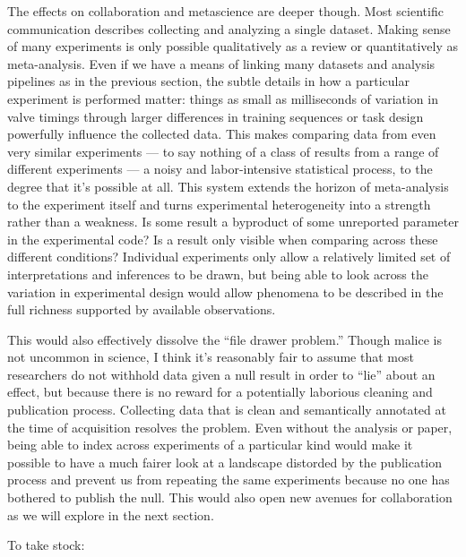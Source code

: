 The effects on collaboration and metascience are deeper though. Most
scientific communication describes collecting and analyzing a single
dataset. Making sense of many experiments is only possible qualitatively
as a review or quantitatively as meta-analysis. Even if we have a means
of linking many datasets and analysis pipelines as in the previous
section, the subtle details in how a particular experiment is performed
matter: things as small as milliseconds of variation in valve timings
through larger differences in training sequences or task design
powerfully influence the collected data. This makes comparing data from
even very similar experiments --- to say nothing of a class of results
from a range of different experiments --- a noisy and labor-intensive
statistical process, to the degree that it's possible at all. This
system extends the horizon of meta-analysis to the experiment itself and
turns experimental heterogeneity into a strength rather than a weakness.
Is some result a byproduct of some unreported parameter in the
experimental code? Is a result only visible when comparing across these
different conditions? Individual experiments only allow a relatively
limited set of interpretations and inferences to be drawn, but being
able to look across the variation in experimental design would allow
phenomena to be described in the full richness supported by available
observations.

This would also effectively dissolve the ``file drawer problem.'' \citep{sterlingPublicationDecisionsTheir1959, francoPublicationBiasSocial2014}  Though malice is not uncommon in
science, I think it's reasonably fair to assume that most researchers do
not withhold data given a null result in order to ``lie'' about an
effect, but because there is no reward for a potentially laborious
cleaning and publication process. Collecting data that is clean and
semantically annotated at the time of acquisition resolves the problem.
Even without the analysis or paper, being able to index across
experiments of a particular kind would make it possible to have a much
fairer look at a landscape distorded by the publication process and
prevent us from repeating the same experiments because no one has
bothered to publish the null. This would also open new avenues for
collaboration as we will explore in the next section.

To take stock:

